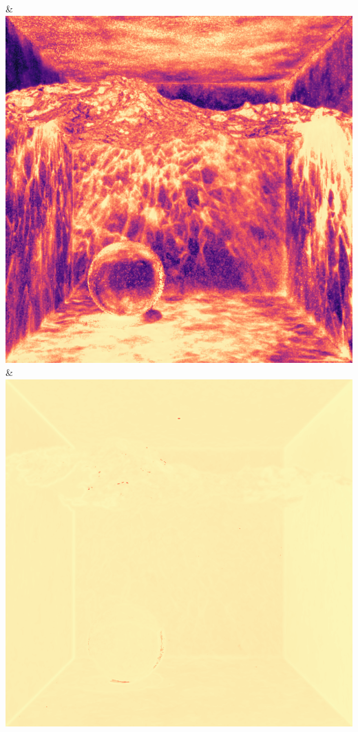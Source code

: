 & \includegraphics[width=\linewidth]{figures/py/tests/quality_comparison/nrc+bt_1spp_caustics_small_flip.png}
& \includegraphics[width=\linewidth]{figures/py/tests/quality_comparison/nrc+lt_1spp_caustics_small_flip.png}
